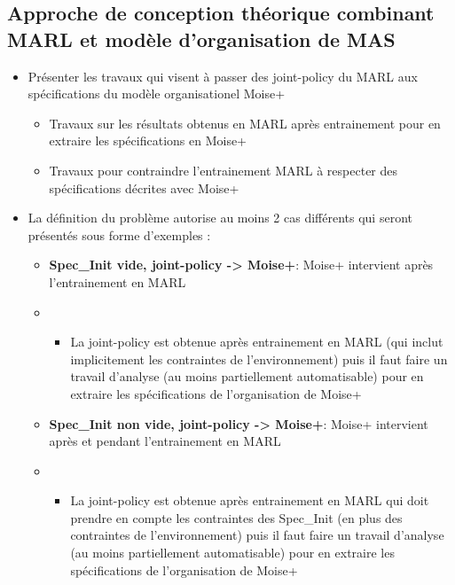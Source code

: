 \documentclass{article}
\begin{document}
\subsection{Approche de conception théorique combinant MARL et modèle d'organisation de MAS}

\begin{itemize}

    \item Présenter les travaux qui visent à passer des joint-policy du MARL aux spécifications du modèle organisationel Moise+
          \begin{itemize}

              \item Travaux sur les résultats obtenus en MARL après entrainement pour en extraire les spécifications en Moise+
              \item Travaux pour contraindre l'entrainement MARL à respecter des spécifications décrites avec Moise+
          \end{itemize}
    \item La définition du problème autorise au moins 2 cas différents qui seront présentés sous forme d'exemples :
          \begin{itemize}
              \item \textbf{Spec\_Init vide, joint-policy -> Moise+}: Moise+ intervient après l'entrainement en MARL
              \item \begin{itemize}
                        \item La joint-policy est obtenue après entrainement en MARL (qui inclut implicitement les contraintes de l'environnement) puis il faut faire un travail d'analyse (au moins partiellement automatisable) pour en extraire les spécifications de l'organisation de Moise+
                    \end{itemize}
              \item \textbf{Spec\_Init non vide, joint-policy -> Moise+}: Moise+ intervient après et pendant l'entrainement en MARL
              \item \begin{itemize}
                        \item La joint-policy est obtenue après entrainement en MARL qui doit prendre en compte les contraintes des Spec\_Init (en plus des contraintes de l'environnement) puis il faut faire un travail d'analyse (au moins partiellement automatisable) pour en extraire les spécifications de l'organisation de Moise+

\end{itemize}
\end{itemize}
\end{itemize}
\end{document}
